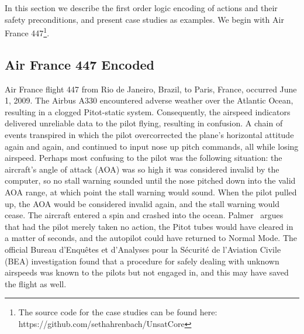 In this section we describe the first order logic encoding of actions and their safety preconditions, and present case studies as examples. We begin with Air France 447\footnote{The source code for the case studies can be found here: https://github.com/sethahrenbach/UnsatCore}.

\subsection{Air France 447 Encoded}

Air France flight 447 from Rio de Janeiro, Brazil, to Paris, France, occurred June 1, 2009. The Airbus A330 encountered adverse weather over the Atlantic Ocean, resulting in a clogged Pitot-static system. Consequently, the airspeed indicators delivered unreliable data to the pilot flying, resulting in confusion. A chain of events transpired in which the pilot overcorrected the plane's horizontal attitude again and again, and continued to input nose up pitch commands, all while losing airspeed. Perhaps most confusing to the pilot was the following situation: the aircraft's  angle of attack (AOA) was so high it was considered invalid by the computer, so no stall warning sounded until the nose pitched down into the valid AOA range, at which point the stall warning would sound. When the pilot pulled up, the AOA would be considered invalid again, and the stall warning would cease. The aircraft entered a spin and crashed into the ocean. Palmer~\cite{AFPalmer} argues that had the pilot merely taken no action, the Pitot tubes would have cleared in a matter of seconds, and the autopilot could have returned to Normal Mode. The official Bureau d'Enqu\^etes et d'Analyses pour la S\'ecurit\'e de l'Aviation Civile (BEA) investigation found that a procedure for safely dealing with unknown airspeeds was known to the pilots but not engaged in, and this may have saved the flight as well.

